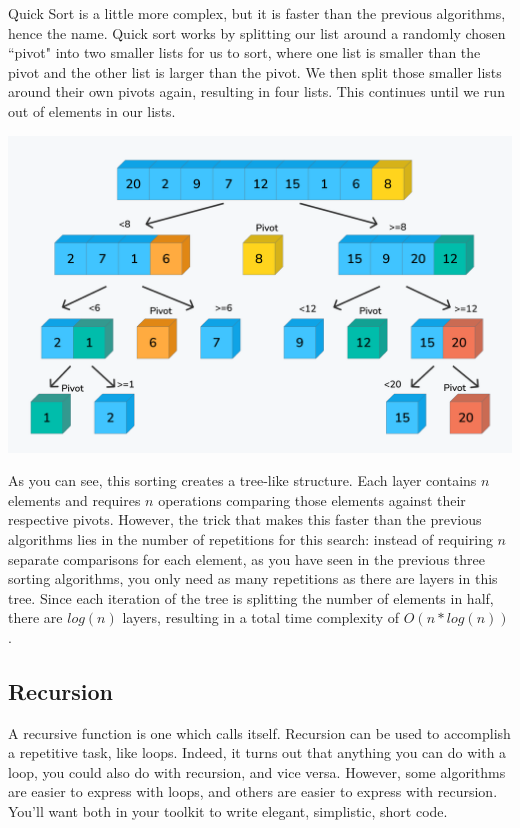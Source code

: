 Quick Sort is a little more complex, but it is faster than the previous algorithms, hence the name. Quick sort works by splitting our list around a randomly chosen ``pivot" into two smaller lists for us to sort, where one list is smaller than the pivot and the other list is larger than the pivot. We then split those smaller lists around their own pivots again, resulting in four lists. This continues until we run out of elements in our lists.

\includegraphics[width=\textwidth]{images/quick-sort.png}

As you can see, this sorting creates a tree-like structure. Each layer contains $n$ elements and requires $n$ operations comparing those elements against their respective pivots. However, the trick that makes this faster than the previous algorithms lies in the number of repetitions for this search: instead of requiring $n$ separate comparisons for each element, as you have seen in the previous three sorting algorithms, you only need as many repetitions as there are layers in this tree. Since each iteration of the tree is splitting the number of elements in half, there are $log(n)$ layers, resulting in a total time complexity of $O(n*log(n))$. 

\subsection{Recursion}
A recursive function is one which calls itself. Recursion can be used to accomplish a repetitive task, like loops. Indeed, it turns out that anything you can do with a loop, you could also do with recursion, and vice versa. However, some algorithms are easier to express with loops, and others are easier to express with recursion. You'll want both in your toolkit to write elegant, simplistic, short code.


